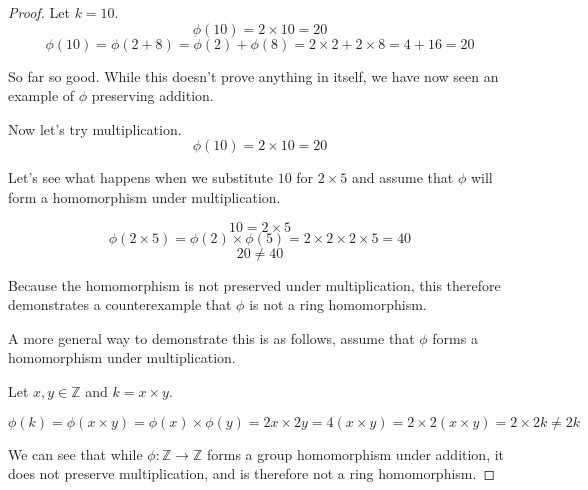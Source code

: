 \documentclass[a4paper]{article}
\begin{document}
\begin{myparindent}{0pt}
\begin{proof}
  Let $k = 10$.
  \[ \phi(10) = 2 \times 10 = 20 \]
  \[ \phi(10) = \phi(2 + 8) = \phi(2) + \phi(8) = 2 \times 2 + 2 \times 8 = 4 + 16 = 20 \]

  So far so good. While this doesn't prove anything in itself, we have now seen an
  example of $\phi$ preserving addition. \newline

  Now let's try multiplication.
  \[ \phi(10) = 2 \times 10 = 20 \]

  Let's see what happens when we substitute $10$ for $2 \times 5$ and assume that
  $\phi$ will form a homomorphism under multiplication.

  \[ 10 = 2 \times 5 \]
  \[ \phi(2 \times 5) = \phi(2) \times \phi(5) = 2 \times 2 \times 2 \times 5 = 40 \]
  \[ 20 \neq 40 \]

  Because the homomorphism is not preserved under multiplication, this therefore
  demonstrates a counterexample that $\phi$ is not a ring homomorphism.

  A more general way to demonstrate this is as follows, assume that $\phi$
  forms a homomorphism under multiplication. \newline

  Let $x, y \in \mathbb{Z}$ and $k = x \times y$.

  \[ \phi(k) = \phi(x \times y) = \phi(x) \times \phi(y) = 2x \times 2y = 4(x \times y) =
  2 \times 2(x \times y) = 2 \times 2k \neq 2k \]

  We can see that while $\phi: \mathbb{Z} \rightarrow \mathbb{Z}$ forms a group
  homomorphism under addition, it does not preserve multiplication, and is
  therefore not a ring homomorphism.

\end{proof}

\end{myparindent}
\end{document}
